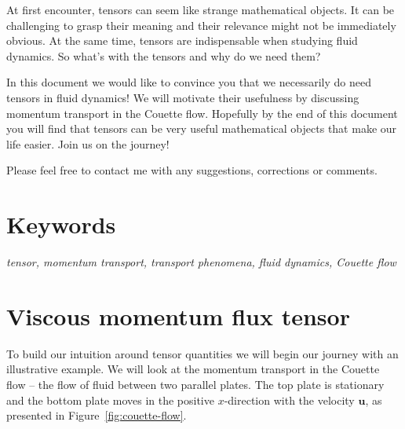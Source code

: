 \documentclass[10pt,twocolumn]{article}
\begin{document}
At first encounter, tensors can seem like strange mathematical objects. It can be challenging to grasp their meaning and their relevance might not be immediately obvious. At the same time, tensors are indispensable when studying fluid dynamics. So what's with the tensors and why do we need them?

In this document we would like to convince you that we necessarily do need tensors in fluid dynamics! We will motivate their usefulness by discussing momentum transport in the Couette flow. Hopefully by the end of this document you will find that tensors can be very useful mathematical objects that make our life easier. Join us on the journey!

Please feel free to contact me with any suggestions, corrections or comments.

\section*{Keywords}

\textit{tensor, momentum transport, transport phenomena, fluid dynamics, Couette flow}


\section*{Viscous momentum flux tensor}

To build our intuition around tensor quantities we will begin our journey with an illustrative example. We will look at the momentum transport in the Couette flow -- the flow of fluid between two parallel plates. The top plate is stationary and the bottom plate moves in the positive $x$-direction with the velocity $\mathbf{u}$, as presented in Figure~\ref{fig:couette-flow}.
\end{document}

